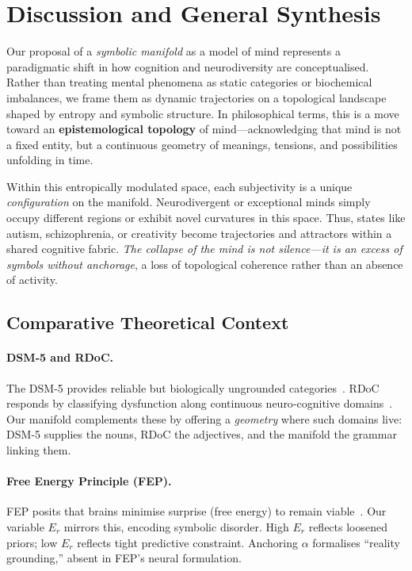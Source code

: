 \section*{Discussion and General Synthesis}

Our proposal of a \emph{symbolic manifold} as a model of mind represents a paradigmatic shift in how cognition and neurodiversity are conceptualised. Rather than treating mental phenomena as static categories or biochemical imbalances, we frame them as dynamic trajectories on a topological landscape shaped by entropy and symbolic structure. In philosophical terms, this is a move toward an \textbf{epistemological topology} of mind—acknowledging that mind is not a fixed entity, but a continuous geometry of meanings, tensions, and possibilities unfolding in time.

Within this entropically modulated space, each subjectivity is a unique \emph{configuration} on the manifold. Neurodivergent or exceptional minds simply occupy different regions or exhibit novel curvatures in this space. Thus, states like autism, schizophrenia, or creativity become trajectories and attractors within a shared cognitive fabric. \textit{The collapse of the mind is not silence—it is an excess of symbols without anchorage}, a loss of topological coherence rather than an absence of activity.

\subsection*{Comparative Theoretical Context}

\paragraph{DSM‑5 and RDoC.}  The DSM‑5 provides reliable but biologically ungrounded categories \cite{apa2013}. RDoC responds by classifying dysfunction along continuous neuro‑cognitive domains \cite{insel2010rdoc}. Our manifold complements these by offering a \emph{geometry} where such domains live: DSM‑5 supplies the nouns, RDoC the adjectives, and the manifold the grammar linking them.

\paragraph{Free Energy Principle (FEP).}  FEP posits that brains minimise surprise (free energy) to remain viable \cite{friston2010fep}. Our variable $E_r$ mirrors this, encoding symbolic disorder. High $E_r$ reflects loosened priors; low $E_r$ reflects tight predictive constraint. Anchoring $\alpha$ formalises “reality grounding,” absent in FEP’s neural formulation.

